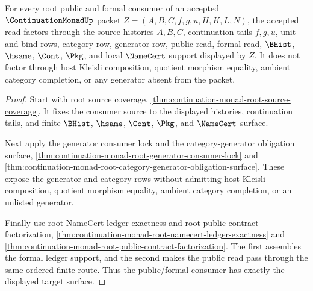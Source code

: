 \begin{theorem}
\label{thm:continuation-monad-root-formal-target-exactness}
For every root public and formal consumer of an accepted $\ContinuationMonadUp$
packet $Z=(A,B,C,f,g,u,H,K,L,N)$, the accepted read factors through the source
histories $A,B,C$, continuation tails $f,g,u$, unit and bind rows, category row,
generator row, public read, formal read, $\BHist$, $\hsame$, $\Cont$, $\Pkg$,
and local $\NameCert$ support displayed by $Z$. It does not factor through host
Kleisli composition, quotient morphism equality, ambient category completion,
or any generator absent from the packet.
\end{theorem}
\begin{proof}
Start with root source coverage,
\autoref{thm:continuation-monad-root-source-coverage}. It fixes the consumer
source to the displayed histories, continuation tails, and finite $\BHist$,
$\hsame$, $\Cont$, $\Pkg$, and $\NameCert$ surface.

Next apply the generator consumer lock and the category-generator obligation
surface,
\autoref{thm:continuation-monad-root-generator-consumer-lock} and
\autoref{thm:continuation-monad-root-category-generator-obligation-surface}.
These expose the generator and category rows without admitting host Kleisli
composition, quotient morphism equality, ambient category completion, or an
unlisted generator.

Finally use root NameCert ledger exactness and root public contract
factorization,
\autoref{thm:continuation-monad-root-namecert-ledger-exactness} and
\autoref{thm:continuation-monad-root-public-contract-factorization}. The first
assembles the formal ledger support, and the second makes the public read pass
through the same ordered finite route. Thus the public/formal consumer has
exactly the displayed target surface.
\end{proof}


